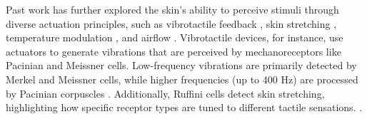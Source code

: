 Past work has further explored the skin's ability to perceive stimuli through diverse actuation principles, such as vibrotactile feedback \cite{Fang2020}, skin stretching \cite{wang2019masque}, temperature modulation \cite{peiris2019thermalbracelet}, and airflow \cite{tseng2020skin}. Vibrotactile devices, for instance, use actuators to generate vibrations that are perceived by mechanoreceptors like Pacinian and Meissner cells. Low-frequency vibrations are primarily detected by Merkel and Meissner cells, while higher frequencies (up to 400 Hz) are processed by Pacinian corpuscles \cite{Fang2022a, lo1984regional}. Additionally, Ruffini cells detect skin stretching, highlighting how specific receptor types are tuned to different tactile sensations. \cite{Fang2022a, lo1984regional, Fang2022a}.


